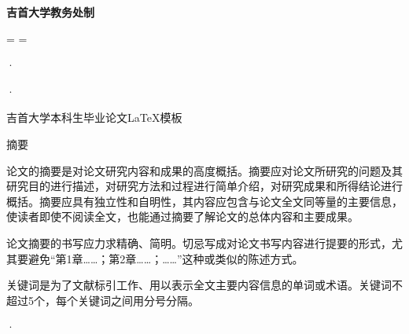 \documentclass[12pt, a4paper, fontset=fandol]{ctexart}
\renewcommand{\baselinestretch}{1.5} %
\newcommand{\coverlishu}{\CJKfamily{coverlishu}}
\newlength{\thesispaperwidth}
\newlength{\thesispaperheight}
\numberwithin{equation}{section}
\begin{document}
\vspace{2.55cm}
\begin{center}
  \coverlishu\bfseries{}\LARGE\textbf{吉首大学教务处制}
\end{center}

\clearpage
\renewcommand{\arraystretch}{1}
\setlength{\paperwidth}{\thesispaperwidth}
\setlength{\paperheight}{\thesispaperheight}
\pdfpagewidth=\thesispaperwidth
\pdfpageheight=\thesispaperheight
\pagestyle{fancy}
\renewcommand{\baselinestretch}{1.5}\selectfont


{\color{white} ·}
\vspace{-1.5em}
\thispagestyle{tocstyle}
{\tableofcontents}
\clearpage
{}


{\color{white} ·} 
\vspace{-3em}

\begin{center}
  {\heiti{}吉首大学本科生毕业论文\LaTeX{}模板\par}
  \vspace{\baselineskip}
  {\heiti{}摘要\par}
  \vspace{\baselineskip}
\end{center}
{}

{\songti{}
论文的摘要是对论文研究内容和成果的高度概括。摘要应对论文所研究的问题及其研究目的进行描述，对研究方法和过程进行简单介绍，对研究成果和所得结论进行概括。摘要应具有独立性和自明性，其内容应包含与论文全文同等量的主要信息，使读者即使不阅读全文，也能通过摘要了解论文的总体内容和主要成果。

论文摘要的书写应力求精确、简明。切忌写成对论文书写内容进行提要的形式，尤其要避免“第1章……；第2章……；……”这种或类似的陈述方式。

关键词是为了文献标引工作、用以表示全文主要内容信息的单词或术语。关键词不超过5个，每个关键词之间用分号分隔。

}


\clearpage


\newfontfamily{} 
{\color{white} ·} 
\vspace{-3em}
\end{document}
